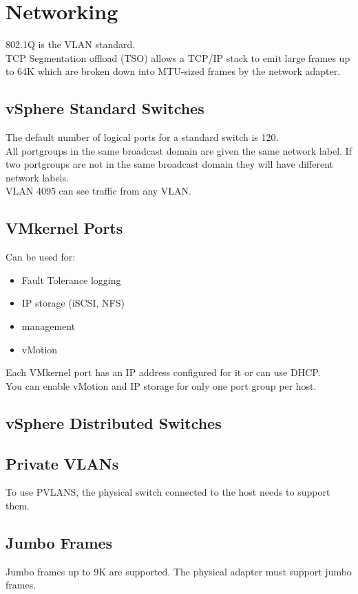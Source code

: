 \documentclass{article}
\begin{document}
\section{Networking}

802.1Q is the VLAN standard.\\

TCP Segmentation offload (TSO) allows a TCP/IP stack to emit large frames
up to 64K which are broken down into MTU-sized frames by the network adapter.

\subsection{vSphere Standard Switches}

The default number of logical ports for a standard switch is 120.\\

All portgroups in the same broadcast domain are given the same network label.
If two portgroups are not in the same broadcast domain they will have different
network labels.\\

VLAN 4095 can see traffic from any VLAN.

\subsection{VMkernel Ports}

Can be used for:

\begin{itemize}
\item Fault Tolerance logging
\item IP storage (iSCSI, NFS)
\item management
\item vMotion
\end{itemize}

Each VMkernel port has an IP address configured for it or can use DHCP.\\

You can enable vMotion and IP storage for only one port group per host.

\subsection{vSphere Distributed Switches}

\subsection{Private VLANs}

To use PVLANS, the physical switch connected to the host needs to support them.

\subsection{Jumbo Frames}

Jumbo frames up to 9K are supported. The physical adapter must support jumbo
frames.
\end{document}
